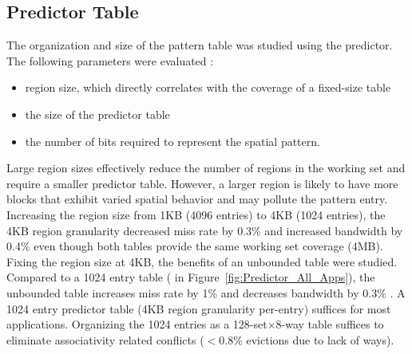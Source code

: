 {{\subsection{Predictor Table}

The organization and size of the pattern table was studied using the  predictor. The following parameters were evaluated :
\begin{itemize}[noitemsep]
  \item region size, which directly correlates with the coverage of a fixed-size table
  \item the size of the predictor table
  \item the number of bits required to represent the spatial pattern.
\end{itemize}

Large region sizes effectively reduce the number of regions in the working set and require a smaller predictor table. However, a larger region is likely to have more blocks that exhibit varied spatial behavior and may pollute the pattern entry.  Increasing the region size from 1KB (4096 entries) to 4KB (1024 entries), the 4KB region granularity decreased miss rate by 0.3\% and increased bandwidth by 0.4\% even though both tables provide the same working set coverage (4MB).  Fixing the region size at 4KB, the benefits of an unbounded table were studied.  Compared to a 1024 entry table ( in Figure~\ref{fig:Predictor_All_Apps}), the unbounded table increases miss rate by 1\% and decreases bandwidth by 0.3\% . A 1024 entry predictor table (4KB region granularity per-entry) suffices for most applications. Organizing the 1024 entries as a 128-set$\times$8-way table suffices to eliminate associativity related conflicts ($<$0.8\% evictions due to lack of ways).

\begin{figure}[h]
  \centering
    

\end{figure}}}
